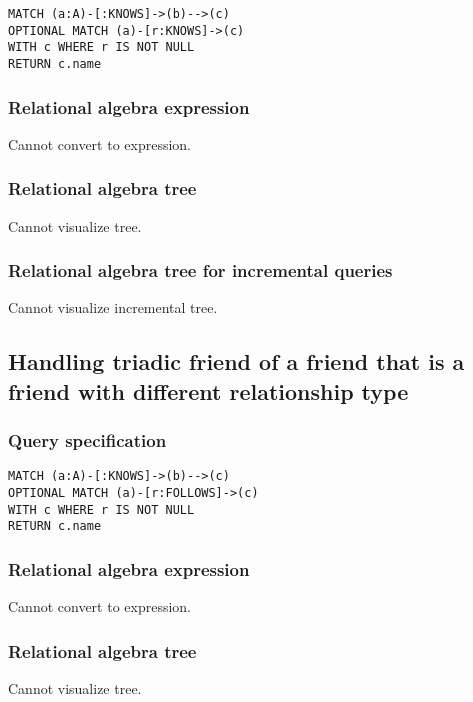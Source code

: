 \begin{lstlisting}
MATCH (a:A)-[:KNOWS]->(b)-->(c)
OPTIONAL MATCH (a)-[r:KNOWS]->(c)
WITH c WHERE r IS NOT NULL
RETURN c.name
\end{lstlisting}

\subsubsection*{Relational algebra expression}

Cannot convert to expression.

\subsubsection*{Relational algebra tree}

Cannot visualize tree.

\subsubsection*{Relational algebra tree for incremental queries}

Cannot visualize incremental tree.

\subsection{Handling triadic friend of a friend that is a friend with different relationship type}

\subsubsection*{Query specification}

\begin{lstlisting}
MATCH (a:A)-[:KNOWS]->(b)-->(c)
OPTIONAL MATCH (a)-[r:FOLLOWS]->(c)
WITH c WHERE r IS NOT NULL
RETURN c.name
\end{lstlisting}

\subsubsection*{Relational algebra expression}

Cannot convert to expression.

\subsubsection*{Relational algebra tree}

Cannot visualize tree.


